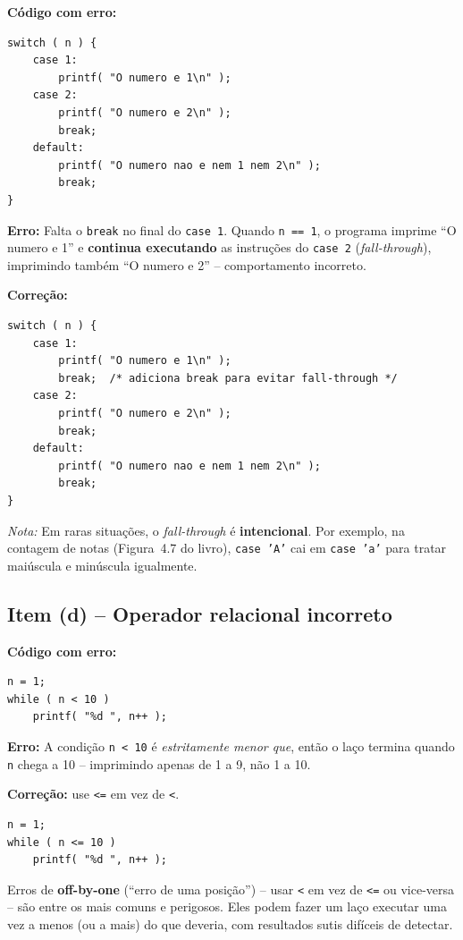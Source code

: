 \documentclass[12pt,a4paper]{article}
\begin{document}
\begin{respostabox}
\textbf{Código com erro:}
\begin{lstlisting}
switch ( n ) {
    case 1:
        printf( "O numero e 1\n" );
    case 2:
        printf( "O numero e 2\n" );
        break;
    default:
        printf( "O numero nao e nem 1 nem 2\n" );
        break;
}
\end{lstlisting}

\textbf{Erro:} Falta o \texttt{break} no final do \texttt{case 1}. Quando \texttt{n == 1},
o programa imprime ``O numero e 1'' e \textbf{continua executando} as instruções do
\texttt{case 2} (\textit{fall-through}), imprimindo também ``O numero e 2'' --
comportamento incorreto.

\textbf{Correção:}
\begin{lstlisting}
switch ( n ) {
    case 1:
        printf( "O numero e 1\n" );
        break;  /* adiciona break para evitar fall-through */
    case 2:
        printf( "O numero e 2\n" );
        break;
    default:
        printf( "O numero nao e nem 1 nem 2\n" );
        break;
}
\end{lstlisting}

\textit{Nota:} Em raras situações, o \textit{fall-through} é \textbf{intencional}.
Por exemplo, na contagem de notas (Figura~4.7 do livro), \texttt{case 'A'} cai em
\texttt{case 'a'} para tratar maiúscula e minúscula igualmente.
\end{respostabox}

\subsection*{Item (d) -- Operador relacional incorreto}

\begin{respostabox}
\textbf{Código com erro:}
\begin{lstlisting}
n = 1;
while ( n < 10 )
    printf( "%d ", n++ );
\end{lstlisting}

\textbf{Erro:} A condição \texttt{n < 10} é \textit{estritamente menor que}, então o
laço termina quando \texttt{n} chega a 10 -- imprimindo apenas de 1 a 9, não 1 a 10.

\textbf{Correção:} use \texttt{<=} em vez de \texttt{<}.
\begin{lstlisting}
n = 1;
while ( n <= 10 )
    printf( "%d ", n++ );
\end{lstlisting}

\begin{erroco}
  Erros de \textbf{off-by-one} (``erro de uma posição'') -- usar \texttt{<} em vez
  de \texttt{<=} ou vice-versa -- são entre os mais comuns e perigosos. Eles
  podem fazer um laço executar uma vez a menos (ou a mais) do que deveria,
  com resultados sutis difíceis de detectar.
\end{erroco}
\end{respostabox}
\end{document}
